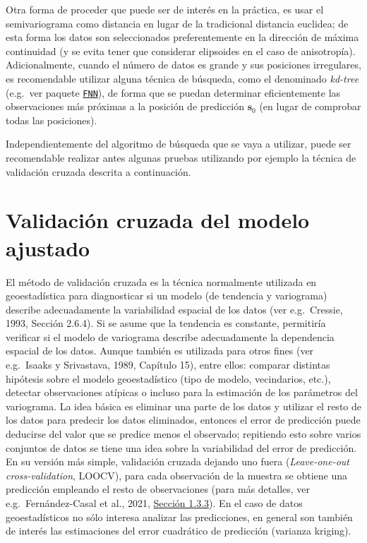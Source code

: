 \documentclass[
  spanish,
]{book}
\theoremstyle{break}
\theoremstyle{definition}
\theoremstyle{definition}
\theoremstyle{definition}
\theoremstyle{definition}
\theoremstyle{remark}
\begin{document}
Otra forma de proceder que puede ser de interés en la práctica, es usar el semivariograma como distancia en lugar de la tradicional distancia euclidea; de esta forma los datos son seleccionados preferentemente en la dirección de máxima continuidad (y se evita tener que considerar elipsoides en el caso de anisotropía).
Adicionalmente, cuando el número de datos es grande y sus posiciones irregulares, es recomendable utilizar alguna técnica de búsqueda, como el denominado \emph{kd-tree} (e.g.~ver paquete \href{https://CRAN.R-project.org/package=FNN}{\texttt{FNN}}), de forma que se puedan determinar eficientemente las observaciones más próximas a la posición de predicción \(\mathbf{s}_{0}\) (en lugar de comprobar todas las posiciones).

Independientemente del algoritmo de búsqueda que se vaya a utilizar, puede ser recomendable realizar antes algunas pruebas utilizando por ejemplo la técnica de validación cruzada descrita a continuación.

\hypertarget{validacion-cruzada}{%
\section{Validación cruzada del modelo ajustado}\label{validacion-cruzada}}

El método de validación cruzada es la técnica normalmente utilizada en geoestadística para diagnosticar si un modelo (de tendencia y variograma) describe adecuadamente la variabilidad espacial de los datos (ver e.g.~Cressie, 1993, Sección 2.6.4).
Si se asume que la tendencia es constante, permitiría verificar si el modelo de variograma describe adecuadamente la dependencia espacial de los datos.
Aunque también es utilizada para otros fines (ver e.g.~Isaaks y Srivastava, 1989, Capítulo 15), entre ellos: comparar distintas hipótesis sobre el modelo geoestadístico (tipo de modelo, vecindarios, etc.), detectar observaciones atípicas o incluso para la estimación de los parámetros del variograma.
La idea básica es eliminar una parte de los datos y utilizar el resto de los datos para predecir los datos eliminados, entonces el error de predicción puede deducirse del valor que se predice menos el observado; repitiendo esto sobre varios conjuntos de datos se tiene una idea sobre la variabilidad del error de predicción.
En su versión más simple, validación cruzada dejando uno fuera (\emph{Leave-one-out cross-validation}, LOOCV), para cada observación de la muestra se obtiene una predicción empleando el resto de observaciones (para más detalles, ver e.g.~Fernández-Casal et al., 2021, \href{https://rubenfcasal.github.io/aprendizaje_estadistico/const-eval.html\#cv}{Sección 1.3.3}).
En el caso de datos geoestadísticos no sólo interesa analizar las predicciones, en general son también de interés las estimaciones del error cuadrático de predicción (varianza kriging).
\end{document}

